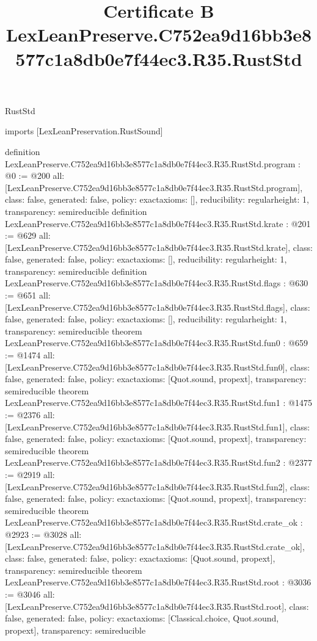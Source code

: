 \begin{lexlean}{RustStd}
\title{Certificate B LexLeanPreserve.C752ea9d16bb3e8577c1a8db0e7f44ec3.R35.RustStd}
\begin{coremodule}
imports [LexLeanPreservation.RustSound]

definition LexLeanPreserve.C752ea9d16bb3e8577c1a8db0e7f44ec3.R35.RustStd.program : @0 := @200 {
  all: [LexLeanPreserve.C752ea9d16bb3e8577c1a8db0e7f44ec3.R35.RustStd.program],
  class: false,
  generated: false,
  policy: exact{axioms: []},
  reducibility: regular{height: 1},
  transparency: semireducible
}
definition LexLeanPreserve.C752ea9d16bb3e8577c1a8db0e7f44ec3.R35.RustStd.krate : @201 := @629 {
  all: [LexLeanPreserve.C752ea9d16bb3e8577c1a8db0e7f44ec3.R35.RustStd.krate],
  class: false,
  generated: false,
  policy: exact{axioms: []},
  reducibility: regular{height: 1},
  transparency: semireducible
}
definition LexLeanPreserve.C752ea9d16bb3e8577c1a8db0e7f44ec3.R35.RustStd.flags : @630 := @651 {
  all: [LexLeanPreserve.C752ea9d16bb3e8577c1a8db0e7f44ec3.R35.RustStd.flags],
  class: false,
  generated: false,
  policy: exact{axioms: []},
  reducibility: regular{height: 1},
  transparency: semireducible
}
theorem LexLeanPreserve.C752ea9d16bb3e8577c1a8db0e7f44ec3.R35.RustStd.fun0 : @659 := @1474 {
  all: [LexLeanPreserve.C752ea9d16bb3e8577c1a8db0e7f44ec3.R35.RustStd.fun0],
  class: false,
  generated: false,
  policy: exact{axioms: [Quot.sound, propext]},
  transparency: semireducible
}
theorem LexLeanPreserve.C752ea9d16bb3e8577c1a8db0e7f44ec3.R35.RustStd.fun1 : @1475 := @2376 {
  all: [LexLeanPreserve.C752ea9d16bb3e8577c1a8db0e7f44ec3.R35.RustStd.fun1],
  class: false,
  generated: false,
  policy: exact{axioms: [Quot.sound, propext]},
  transparency: semireducible
}
theorem LexLeanPreserve.C752ea9d16bb3e8577c1a8db0e7f44ec3.R35.RustStd.fun2 : @2377 := @2919 {
  all: [LexLeanPreserve.C752ea9d16bb3e8577c1a8db0e7f44ec3.R35.RustStd.fun2],
  class: false,
  generated: false,
  policy: exact{axioms: [Quot.sound, propext]},
  transparency: semireducible
}
theorem LexLeanPreserve.C752ea9d16bb3e8577c1a8db0e7f44ec3.R35.RustStd.crate_ok : @2923 := @3028 {
  all: [LexLeanPreserve.C752ea9d16bb3e8577c1a8db0e7f44ec3.R35.RustStd.crate_ok],
  class: false,
  generated: false,
  policy: exact{axioms: [Quot.sound, propext]},
  transparency: semireducible
}
theorem LexLeanPreserve.C752ea9d16bb3e8577c1a8db0e7f44ec3.R35.RustStd.root : @3036 := @3046 {
  all: [LexLeanPreserve.C752ea9d16bb3e8577c1a8db0e7f44ec3.R35.RustStd.root],
  class: false,
  generated: false,
  policy: exact{axioms: [Classical.choice, Quot.sound, propext]},
  transparency: semireducible
}


\end{coremodule}
\end{lexlean}

